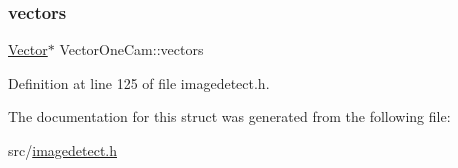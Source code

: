 \subsubsection{\texorpdfstring{vectors}{vectors}}
{\footnotesize\ttfamily \mbox{\hyperlink{struct_vector}{Vector}}$\ast$ Vector\+One\+Cam\+::vectors}



Definition at line 125 of file imagedetect.\+h.



The documentation for this struct was generated from the following file\+:\begin{DoxyCompactItemize}
\item 
src/\mbox{\hyperlink{imagedetect_8h}{imagedetect.\+h}}\end{DoxyCompactItemize}
